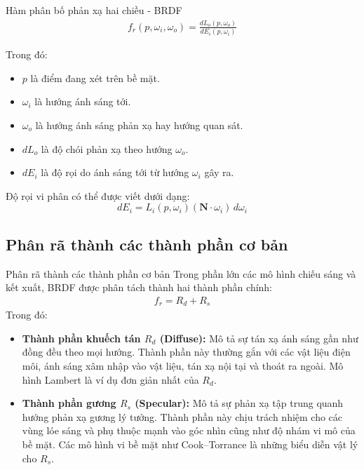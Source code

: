 \documentclass[11pt, aspectratio=169]{beamer}
\begin{document}
\begin{frame}{Hàm phân bố phản xạ hai chiều - BRDF}
	\begin{gather*}
		f_r(p, \omega_i, \omega_o) = \frac{dL_o(p, \omega_o)}{dE_i(p, \omega_i)}
	\end{gather*}
	
	Trong đó:
	\begin{itemize}
		\item $p$ là điểm đang xét trên bề mặt.
		\item $\omega_i$ là hướng ánh sáng tới.
		\item $\omega_o$ là hướng ánh sáng phản xạ hay hướng quan sát.
		\item $dL_o$ là độ chói phản xạ theo hướng $\omega_o$.
		\item $dE_i$ là độ rọi do ánh sáng tới từ hướng $\omega_i$ gây ra.
	\end{itemize}
	
	Độ rọi vi phân có thể được viết dưới dạng:
	\begin{equation}
		dE_i = L_i(p, \omega_i) (\mathbf{N} \cdot \omega_i) \, d\omega_i
	\end{equation}
\end{frame}

\subsection{Phân rã thành các thành phần cơ bản}
\begin{frame}{Phân rã thành các thành phần cơ bản}
	Trong phần lớn các mô hình chiếu sáng và kết xuất, BRDF được phân tách thành hai thành phần chính:
	\begin{gather*}
		f_r = R_d + R_s
	\end{gather*}
	Trong đó:
	\begin{itemize}
		\item \textbf{Thành phần khuếch tán $R_d$ (Diffuse):} Mô tả sự tán xạ ánh sáng gần như đồng đều theo mọi hướng. Thành phần này thường gắn với các vật liệu điện môi, ánh sáng xâm nhập vào vật liệu, tán xạ nội tại và thoát ra ngoài. Mô hình Lambert là ví dụ đơn giản nhất của $R_d$.
		
		\item \textbf{Thành phần gương $R_s$ (Specular):} Mô tả sự phản xạ tập trung quanh hướng phản xạ gương lý tưởng. Thành phần này chịu trách nhiệm cho các vùng lóe sáng và phụ thuộc mạnh vào góc nhìn cũng như độ nhám vi mô của bề mặt. Các mô hình vi bề mặt như Cook–Torrance là những biểu diễn vật lý cho $R_s$.
	\end{itemize}
\end{frame}
\end{document}
